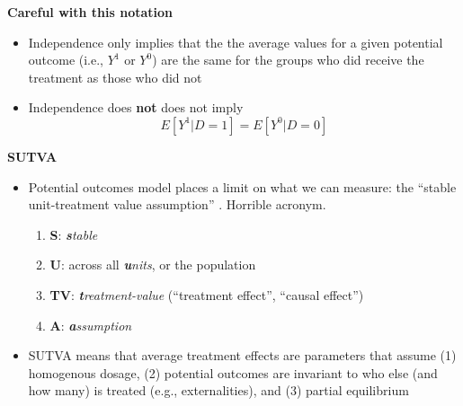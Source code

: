 \documentclass[notes=show]{beamer}
\begin{document}
\begin{frame}[plain]
	\begin{center}
	\textbf{Careful with this notation}
	\end{center}	
	
	\begin{itemize}
	\item Independence only implies that the the average values for a given potential outcome (i.e., $Y^1$ or $Y^0$) are the same for the groups who did receive the treatment as those who did not
	\item Independence does \textbf{not} does not imply  $$E[Y^1 | D=1] = E[Y^0 | D=0]$$
	\end{itemize}
\end{frame}


\begin{frame}[plain]
	\begin{center}
	\textbf{SUTVA}
	\end{center}

	\begin{itemize}
	\item Potential outcomes model places a limit on what we can measure: the ``stable unit-treatment value assumption'' . Horrible acronym. 
		\begin{enumerate}
		\item \textbf{S}: \emph{\textbf{s}table} 
		\item \textbf{U}: across all \emph{\textbf{u}nits}, or the population
		\item \textbf{TV}: \emph{\textbf{t}reatment-value} (``treatment effect'', ``causal effect'')
		\item \textbf{A}: \emph{\textbf{a}ssumption}
		\end{enumerate}
	\item SUTVA means that average treatment effects are parameters that assume (1) homogenous dosage, (2) potential outcomes are invariant to who else (and how many) is treated (e.g., externalities), and (3) partial equilibrium
	\end{itemize}
\end{frame}
\end{document}
